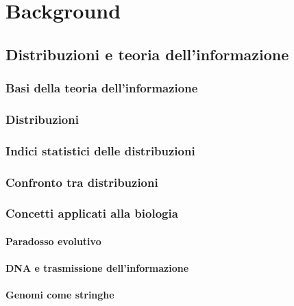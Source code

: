 
\chapter{Background}

\section{Distribuzioni e teoria dell'informazione}

\subsection{Basi della teoria dell'informazione}

\subsection{Distribuzioni}
\subsection{Indici statistici delle distribuzioni}

\subsection{Confronto tra distribuzioni}

\subsection{Concetti applicati alla biologia}

\subsubsection{Paradosso evolutivo}

\subsubsection{DNA e trasmissione dell'informazione}
\subsubsection{Genomi come stringhe}

